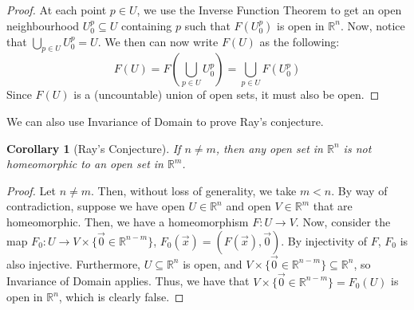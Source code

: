 \documentclass{article}
\newcommand{\R}{\mathbb{R}}
\theoremstyle{plain} %
\numberwithin{thm}{section} %
\newtheorem{cor}[thm]{Corollary}
\theoremstyle{definition} %
\begin{document}
\begin{proof}
At each point $p \in U$, we use the Inverse Function Theorem to get an open neighbourhood $U_0^p \subseteq U$ containing $p$ such that $F(U_0^p)$ is open in $\R^n$. Now, notice that $\bigcup_{p \in U} U_0^p = U$. We then can now write $F(U)$ as the following:
\[
    F(U) = F\left(\bigcup_{p \in U} U_0^p\right) = \bigcup_{p \in U} F(U_0^p)
\]
Since $F(U)$ is a (uncountable) union of open sets, it must also be open.
\end{proof}

We can also use Invariance of Domain to prove Ray's conjecture.

\begin{cor}[Ray's Conjecture]
    \label{rayconj}
    If $n \neq m$, then any open set in $\R^n$ is not homeomorphic to an open set in $\R^m$.
\end{cor}

\begin{proof}
Let $n \neq m$. Then, without loss of generality, we take $m < n$. By way of contradiction, suppose we have open $U \in \R^n$ and open $V \in \R^m$ that are homeomorphic. Then, we have a homeomorphism $F: U \to V$. Now, consider the map $F_0: U \to V \times \{\vec{0} \in \R^{n - m}\}$, $F_0(\vec{x}) = (F(\vec{x}), \vec{0})$. By injectivity of $F$, $F_0$ is also injective. Furthermore, $U \subseteq \R^n$ is open, and $V \times \{\vec{0} \in \R^{n - m}\} \subseteq \R^n$, so Invariance of Domain applies. Thus, we have that $V \times \{\vec{0} \in \R^{n - m}\} = F_0(U)$ is open in $\R^n$, which is clearly false.
\end{proof}
\end{document}
